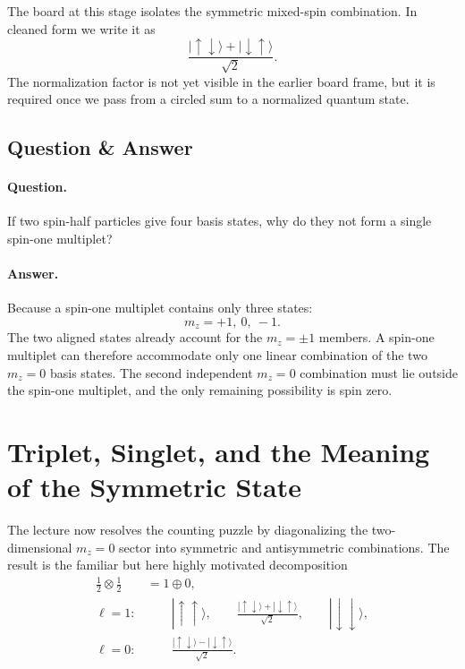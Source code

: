 The board at this stage isolates the symmetric mixed-spin combination. In cleaned form we write it as
\begin{equation}
\frac{|\uparrow\downarrow\rangle+|\downarrow\uparrow\rangle}{\sqrt2}.
\end{equation}
The normalization factor is not yet visible in the earlier board frame, but it is required once we pass from a circled sum to a normalized quantum state.

\subsection{Question \& Answer}

\paragraph{Question.} If two spin-half particles give four basis states, why do they not form a single spin-one multiplet?

\paragraph{Answer.} Because a spin-one multiplet contains only three states:
\[
m_z=+1,\ 0,\ -1.
\]
The two aligned states already account for the \(m_z=\pm1\) members. A spin-one multiplet can therefore accommodate only one linear combination of the two \(m_z=0\) basis states. The second independent \(m_z=0\) combination must lie outside the spin-one multiplet, and the only remaining possibility is spin zero.

\section{Triplet, Singlet, and the Meaning of the Symmetric State}

The lecture now resolves the counting puzzle by diagonalizing the two-dimensional \(m_z=0\) sector into symmetric and antisymmetric combinations. The result is the familiar but here highly motivated decomposition
\begin{align}
\frac12\otimes\frac12 &= 1\oplus 0, \\
\ell=1:&\qquad
|\uparrow\uparrow\rangle,\qquad
\frac{|\uparrow\downarrow\rangle+|\downarrow\uparrow\rangle}{\sqrt2},\qquad
|\downarrow\downarrow\rangle, \\
\ell=0:&\qquad
\frac{|\uparrow\downarrow\rangle-|\downarrow\uparrow\rangle}{\sqrt2}.
\end{align}

